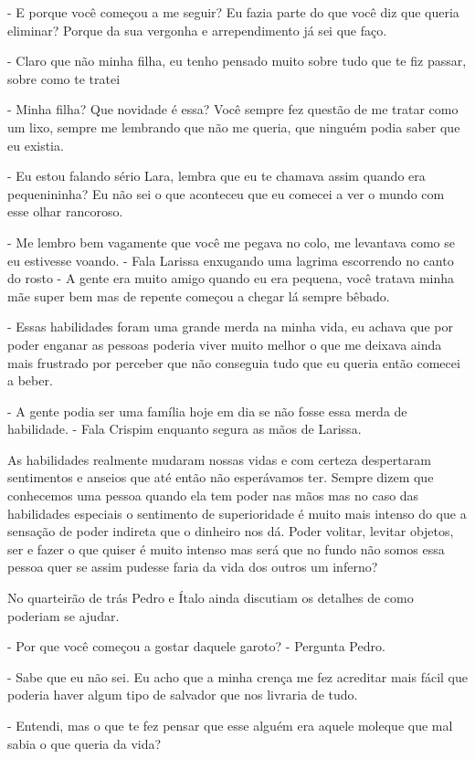 - E porque você começou a me seguir? Eu fazia parte do que você diz que queria eliminar? Porque da sua vergonha e arrependimento já sei que faço.

- Claro que não minha filha, eu tenho pensado muito sobre tudo que te fiz passar, sobre como te tratei

- Minha filha? Que novidade é essa? Você sempre fez questão de me tratar como um lixo, sempre me lembrando que não me queria, que ninguém podia saber que eu existia.

- Eu estou falando sério Lara, lembra que eu te chamava assim quando era pequenininha? Eu não sei o que aconteceu que eu comecei a ver o mundo com esse olhar rancoroso.

- Me lembro bem vagamente que você me pegava no colo, me levantava como se eu estivesse voando. - Fala Larissa enxugando uma lagrima escorrendo no canto do rosto - A gente era muito amigo quando eu era pequena, você tratava minha mãe super bem mas de repente começou a chegar lá sempre bêbado.

- Essas habilidades foram uma grande merda na minha vida, eu achava que por poder enganar as pessoas poderia viver muito melhor o que me deixava ainda mais frustrado por perceber que não conseguia tudo que eu queria então comecei a beber.

- A gente podia ser uma família hoje em dia se não fosse essa merda de habilidade. - Fala Crispim enquanto segura as mãos de Larissa.

As habilidades realmente mudaram nossas vidas e com certeza despertaram sentimentos e anseios que até então não esperávamos ter. Sempre dizem que conhecemos uma pessoa quando ela tem poder nas mãos mas no caso das habilidades especiais o sentimento de superioridade é muito mais intenso do que a sensação de poder indireta que o dinheiro nos dá. Poder volitar, levitar objetos, ser e fazer o que quiser é muito intenso mas será que no fundo não somos essa pessoa quer se assim pudesse faria da vida dos outros um inferno?

No quarteirão de trás Pedro e Ítalo ainda discutiam os detalhes de como poderiam se ajudar.

- Por que você começou a gostar daquele garoto? - Pergunta Pedro.

- Sabe que eu não sei. Eu acho que a minha crença me fez acreditar mais fácil que poderia haver algum tipo de salvador que nos livraria de tudo.

- Entendi, mas o que te fez pensar que esse alguém era aquele moleque que mal sabia o que queria da vida?

